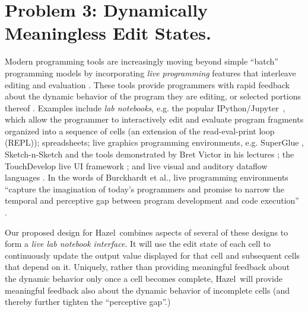 \documentclass[letterpaper,USenglish]{lipics-v2016}
\newcommand{\Hazel}[0]{\textsf{Hazel}}
\newcommand{\HazelEnv}[0]{\Hazel}
\begin{document}
\section{Problem 3: Dynamically Meaningless Edit States.} Modern programming
tools are increasingly moving beyond simple ``batch'' programming models by
incorporating \emph{live programming} features that interleave editing and
evaluation \cite{DBLP:conf/icse/Tanimoto13,DBLP:journals/vlc/Tanimoto90,McDirmid:2007:LUL:1297105.1297073}. These tools provide programmers with rapid feedback about the
dynamic behavior of the program they are editing, or selected portions thereof \cite{McDirmid:2013:ULP:2509578.2509585}. Examples include \emph{lab notebooks},
e.g. the popular IPython/Jupyter~\cite{Perez:2007:ISI:1251563.1251831}, which allow the
programmer to interactively edit and evaluate program fragments organized into a
sequence of cells (an extension of the read-eval-print loop (REPL)); spreadsheets; {live graphics programming environments}, e.g. SuperGlue \cite{McDirmid:2007:LUL:1297105.1297073}, Sketch-n-Sketch \cite{DBLP:conf/pldi/ChughHSA16,DBLP:conf/icse/Chugh25} and the tools demonstrated by Bret Victor in his lectures \cite{victor2012inventing}; the TouchDevelop live UI framework \cite{burckhardt2013s}; and live visual and auditory dataflow languages \cite{DBLP:conf/vl/BurnettAW98}. In the words of Burckhardt et al., live programming environments 
``capture the imagination of today's programmers and promise to narrow the temporal and perceptive gap 
between program development and code execution'' \cite{burckhardt2013s}. 

Our proposed design for \HazelEnv~combines aspects of several of these designs to form a \emph{live lab notebook interface}. 
It will use the edit state of each cell to continuously update the output
value displayed for that cell and subsequent cells that depend on
it. Uniquely, rather than providing meaningful feedback about the dynamic
behavior only once a cell becomes complete, \HazelEnv~will provide meaningful feedback also
about the dynamic behavior of incomplete cells (and thereby further tighten the ``perceptive gap''.)
\end{document}
